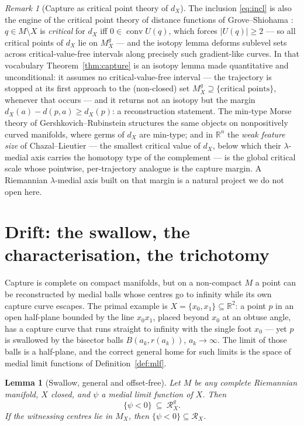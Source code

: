 \documentclass[11pt]{article}
\newtheorem{lemma}[theorem]{Lemma}
\theoremstyle{remark}
\newtheorem{remark}[theorem]{Remark}
\newcommand{\R}{\mathbb{R}}
\newcommand{\X}{X}
\newcommand{\Mx}{M_{\X}}
\newcommand{\Mg}{M^{g}_{\X}}
\newcommand{\Rx}{\mathcal{R}_{\X}}
\newcommand{\Rg}{\mathcal{R}^{g}_{\X}}
\newcommand{\dX}{d_{\X}}
\newcommand{\conv}{\operatorname{conv}}
\begin{document}
\begin{remark}[Capture as critical point theory of $\dX$]
\label{rem:critical}
The inclusion \eqref{eq:incl} is also the engine of the critical
point theory of distance functions of Grove--Shiohama
\cite{GS,Che,Grv}: $q\in M\setminus\X$ is \emph{critical} for
$\dX$ iff $0\in\conv U(q)$, which forces $|U(q)|\ge2$ --- so all
critical points of $\dX$ lie on $\Mg$ --- and the isotopy lemma
deforms sublevel sets across critical-value-free intervals along
precisely such gradient-like curves. In that vocabulary
Theorem~\ref{thm:capture} is an isotopy lemma made quantitative
and unconditional: it assumes no critical-value-free interval ---
the trajectory is stopped at its first approach to the
(non-closed) set $\Mg\supseteq\{\text{critical points}\}$,
whenever that occurs --- and it returns not an isotopy but the
margin $\dX(a)-d(p,a)\ge\dX(p)$: a reconstruction statement. The
min-type Morse theory of Gershkovich--Rubinstein \cite{GR}
structures the same objects on nonpositively curved manifolds,
where germs of $\dX$ are min-type; and in $\R^{n}$ the \emph{weak
feature size} of Chazal--Lieutier \cite{CL} --- the smallest
critical value of $\dX$, below which their $\lambda$-medial axis
carries the homotopy type of the complement --- is the global
critical scale whose pointwise, per-trajectory analogue is the
capture margin. A Riemannian $\lambda$-medial axis built on that
margin is a natural project we do not open here.
\end{remark}

\section{Drift: the swallow, the characterisation, the trichotomy}
\label{sec:drift}

Capture is complete on compact manifolds, but on a non-compact $M$ a
point can be reconstructed by medial balls whose centres go to
infinity while its own capture curve escapes. The primal example is
$\X=\{x_{0},x_{1}\}\subseteq\R^{2}$: a point $p$ in an open half-plane
bounded by the line $x_{0}x_{1}$, placed beyond $x_{0}$ at an obtuse
angle, has a capture curve that runs straight to infinity with the
single foot $x_{0}$ --- yet $p$ is swallowed by the bisector balls
$B(a_{k},r(a_{k}))$, $a_{k}\to\infty$. The limit of those balls is a
half-plane, and the correct general home for such limits is the space
of medial limit functions of Definition~\ref{def:mlf}.

\begin{lemma}[Swallow, general and offset-free]\label{lem:swallow}
Let $M$ be any complete Riemannian manifold, $\X$ closed, and $\psi$ a
medial limit function of $\X$. Then
\[
  \{\psi<0\}\ \subseteq\ \Rg .
\]
If the witnessing centres lie in $\Mx$, then $\{\psi<0\}\subseteq\Rx$.
\end{lemma}
\end{document}
